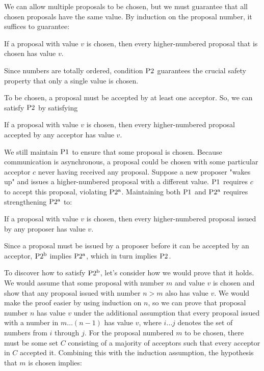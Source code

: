 We can allow multiple proposals to be chosen, but we must guarantee that all chosen proposals have the same value.
By induction on the proposal number, it suffices to guarantee:

\begin{paxostheoremenv}[$\PaxosTheorem{2}$]
    If a proposal with value $v$ is chosen, then every higher-numbered proposal that is chosen has value $v$.
\end{paxostheoremenv}

Since numbers are totally ordered, condition $\PaxosTheorem{2}$ guarantees the crucial safety property that only a single value is chosen.

To be chosen, a proposal must be accepted by at least one acceptor.
So, we can satisfy $\PaxosTheorem{2}$ by satisfying

\begin{paxostheoremenv}[$\PaxosSubtheorem{2}{a}$]
    If a proposal with value $v$ is chosen, then every higher-numbered proposal accepted by any acceptor has value $v$.
\end{paxostheoremenv}

We still maintain $\operatorname{P1^{}}$ to ensure that some proposal is chosen.
Because communication is asynchronous, a proposal could be chosen with some particular acceptor $c$ never having received any proposal.
Suppose a new proposer "wakes up" and issues a higher-numbered proposal with a different value.
$\operatorname{P1^{}}$ requires $c$ to accept this proposal, violating $\PaxosSubtheorem{2}{a}$.
Maintaining both $\operatorname{P1^{}}$ and $\PaxosSubtheorem{2}{a}$ requires strengthening $\PaxosSubtheorem{2}{a}$ to:

\begin{paxostheoremenv}[$\PaxosSubtheorem{2}{b}$]
    If a proposal with value $v$ is chosen, then every higher-numbered proposal issued by any proposer has value $v$.
\end{paxostheoremenv}

Since a proposal must be issued by a proposer before it can be accepted by an acceptor, $\PaxosSubtheorem{2}{b}$ implies $\PaxosSubtheorem{2}{a}$, which in turn implies $\PaxosTheorem{2}$.

To discover how to satisfy $\PaxosSubtheorem{2}{b}$, let's consider how we would prove that it holds.
We would assume that some proposal with number $m$ and value $v$ is chosen and show that any proposal issued with number $n > m$ also has value $v$.
We would make the proof easier by using induction on $n$, so we can prove that proposal number $n$ has value $v$ under the additional assumption that every proposal issued with a number in $m\ldots(n - 1)$ has value $v$, where $i \ldots j$ denotes the set of numbers from $i$ through $j$.
For the proposal numbered $m$ to be chosen, there must be some set $C$ consisting of a majority of acceptors such that every acceptor in $C$ accepted it.
Combining this with the induction assumption, the hypothesis that $m$ is chosen implies:


